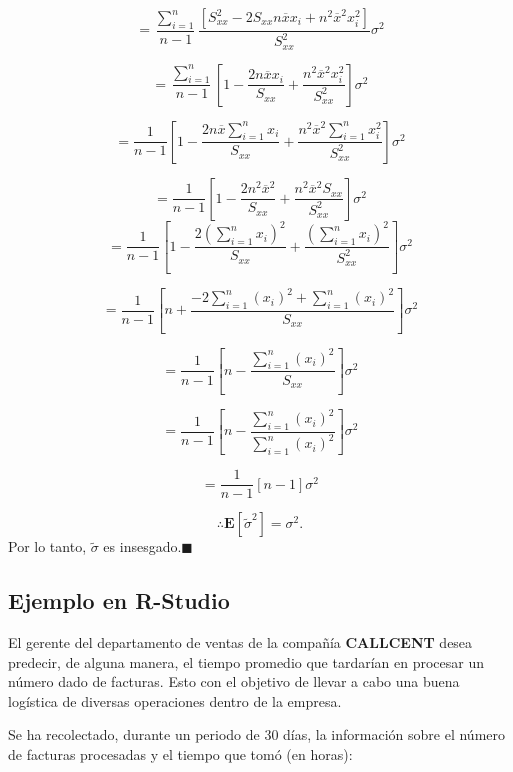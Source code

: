 \documentclass[
  a4paper,
  oneside,
  openany]{book}
\begin{document}
\[=\frac{\sum_{i=1}^{n}}{n-1}\frac{[S_{xx}^2-2S_{xx}n\overline{x}x_{i}+n^2\overline{x}^2x_{i}^2]}{S_{xx}^2}\sigma^2\]

\[=\frac{\sum_{i=1}^{n}}{n-1}\left[ 1-\frac{2n\overline{x}x_{i}}{S_{xx}}+\frac{n^2\overline{x}^2x_{i}^2}{S_{xx}^2}\right]\sigma^2\]

\[=\frac{1}{n-1}\left[ 1-\frac{2n\overline{x}\sum_{i=1}^{n}x_{i}}{S_{xx}}+\frac{n^2\overline{x}^2\sum_{i=1}^{n}x_{i}^2}{S_{xx}^2}\right]\sigma^2\]

\[=\frac{1}{n-1}\left[ 1-\frac{2n^2\overline{x}^2}{S_{xx}}+\frac{n^2\overline{x}^2S_{xx}}{S_{xx}^2}\right]\sigma^2\]
\[=\frac{1}{n-1}\left[ 1-\frac{2(\sum_{i=1 }^{n}x_{i})^2}{S_{xx}}+\frac{(\sum_{i=1}^{n}x_{i})^2}{S_{xx}^2}\right]\sigma^2\]

\[=\frac{1}{n-1}\left[ n+\frac{-2\sum_{i=1 }^{n}(x_{i})^2+\sum_{i=1}^{n}(x_{i})^2}{S_{xx}}\right]\sigma^2\]

\[=\frac{1}{n-1}\left[ n-\frac{\sum_{i=1 }^{n}(x_{i})^2}{S_{xx}}\right]\sigma^2\]

\[=\frac{1}{n-1}\left[ n-\frac{\sum_{i=1 }^{n}(x_{i})^2}{\sum_{i=1 }^{n}(x_{i})^2}\right]\sigma^2\]

\[=\frac{1}{n-1}\left[ n-1\right]\sigma^2\]

\[ \therefore \mathbf{E}[\tilde{\sigma}^2]=\sigma^2.\]
Por lo tanto, \(\tilde{\sigma}\) es insesgado.\(\blacksquare\)

\hypertarget{ejemplo-en-r-studio-18}{%
\subsection{Ejemplo en R-Studio}\label{ejemplo-en-r-studio-18}}

El gerente del departamento de ventas de la compañía \textbf{CALLCENT} desea predecir, de alguna manera, el tiempo promedio que tardarían en procesar un número dado de facturas. Esto con el objetivo de llevar a cabo una buena logística de diversas operaciones dentro de la empresa.

Se ha recolectado, durante un periodo de 30 días, la información sobre el número de facturas procesadas y el tiempo que tomó (en horas):
\end{document}
